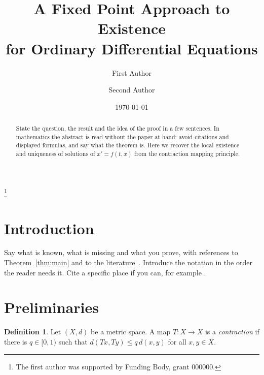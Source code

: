 \documentclass[11pt,a4paper]{amsart}
\theoremstyle{plain}   %
\theoremstyle{definition}  %
\newtheorem{definition}[theorem]{Definition}
\theoremstyle{remark}      %
\numberwithin{equation}{section}  %
\begin{document}
\title[Short running title]{A Fixed Point Approach to Existence\\ for Ordinary Differential Equations}

\author{First Author}
\address{Department of Mathematics, Example University, City, Country}

\author{Second Author}
\address{Institute of Analysis, Another University, City, Country}

\thanks{The first author was supported by Funding Body, grant 000000.}
\date{\today}

\begin{abstract}
State the question, the result and the idea of the proof in a few sentences. In
mathematics the abstract is read without the paper at hand: avoid citations and
displayed formulas, and say what the theorem is. Here we recover the local existence
and uniqueness of solutions of $x' = f(t,x)$ from the contraction mapping principle.
\end{abstract}

\maketitle

\section{Introduction}\label{sec:intro}
Say what is known, what is missing and what you prove, with references to
Theorem~\ref{thm:main} and to the literature~\cite{coddington55,rudin76}. Introduce the
notation in the order the reader needs it. Cite a specific place if you can,
for example \cite[Chapter~1]{coddington55}.

\section{Preliminaries}\label{sec:prelim}
\begin{definition}\label{def:contraction}
  Let $(X,d)$ be a metric space. A map $T\colon X\to X$ is a \emph{contraction} if there is
  $q\in[0,1)$ such that $d(Tx,Ty)\le q\,d(x,y)$ for all $x,y\in X$.
\end{definition}
\end{document}
